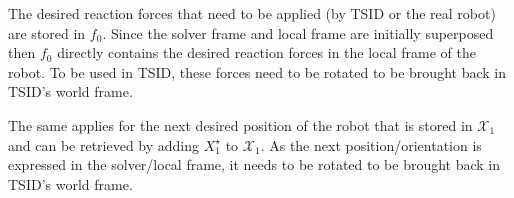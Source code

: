 \documentclass[a4paper,11pt]{article}
\begin{document}
The desired reaction forces that need to be applied (by TSID or the real robot) are stored in $f_0$. Since the solver frame and local frame are initially superposed then $f_0$ directly contains the desired reaction forces in the local frame of the robot. To be used in TSID, these forces need to be rotated to be brought back in TSID's world frame. 

The same applies for the next desired position of the robot that is stored in $\mathcal{X}_1$ and can be retrieved by adding $X_1^\star$ to $\mathcal{X}_1$. As the next position/orientation is expressed in the solver/local frame, it needs to be rotated to be brought back in TSID's world frame.
\end{document}
